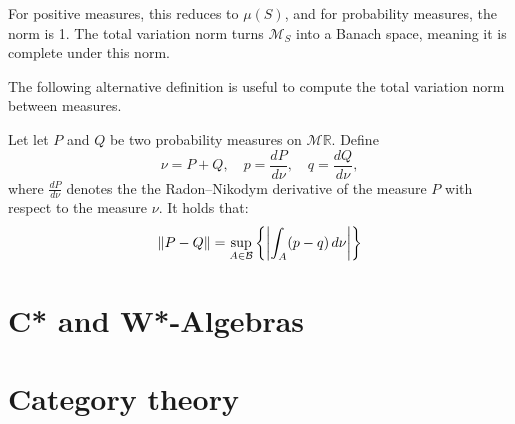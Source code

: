 For positive measures, this reduces to \( \mu(S) \), and for probability measures, the norm is 1. The total variation norm turns \( \mathcal{M}_S \) into a Banach space, meaning it is complete under this norm. 

The following alternative definition is useful to compute the total variation norm between measures.

  \begin{definition} \cite{tsybakov2008}
    Let  let $P$ and $Q$ be two probability measures on $\mathcal{M}\mathbb{R}$. Define
    $$
      \nu = P + Q, \quad p = \frac{dP}{d\nu}, \quad q = \frac{dQ}{d\nu},
    $$
    where $\frac{dP}{d\nu}$ denotes the  the Radon–Nikodym derivative of the measure $P$ with respect to the measure $\nu$. It holds that:
    \begin{align*}
      \left\lVert P-Q \right\rVert = \sup_{A \in  \mathcal{B}} \left\{ \left\vert \int_{A} (p - q) \, d\nu \right\vert \right\}
    \end{align*}

  \end{definition}

  


   











\section{C* and W*-Algebras} \label{sec:c*_w*}


\section{Category theory} \label{sec:catgories}

